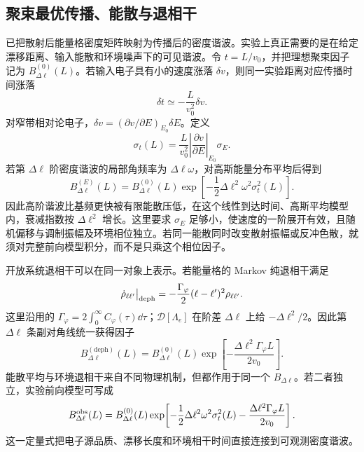 
\subsection{聚束最优传播、能散与退相干}\label{subsec:bunching-decoherence-closure-dp47}

 已把散射后能量格密度矩阵映射为传播后的密度谐波。实验上真正需要的是在给定漂移距离、输入能散和环境噪声下的可见谐波。令 $t=L/v_0$，并把理想聚束因子记为 $B_{\Delta\ell}^{(0)}(L)$。若输入电子具有小的速度涨落 $\delta v$，则同一实验距离对应传播时间涨落
\begin{equation*}
 \delta t\simeq-\frac{L}{v_0^2}\delta v.
\end{equation*}
对窄带相对论电子，$\delta v=(\partial v/\partial E)_{E_0}\delta E$。定义
\begin{equation}
{
 \sigma_t(L)
 =\frac{L}{v_0^2}
 \left|\frac{\partial v}{\partial E}\right|_{E_0}\sigma_E .}
\label{eq:arrival_time_jitter_energy_spread_dp47}
\end{equation}
若第 $\Delta\ell$ 阶密度谐波的局部角频率为 $\Delta\ell\omega$，对高斯能量分布平均后得到
\begin{equation}
{
 B_{\Delta\ell}^{(E)}(L)
 =B_{\Delta\ell}^{(0)}(L)
 \exp\!\left[-\frac12\Delta\ell^2\omega^2\sigma_t^2(L)\right].}
\label{eq:bunching_energy_spread_damping_dp47}
\end{equation}
因此高阶谐波比基频更快被有限能散压低，在这个线性到达时间、高斯平均模型内，衰减指数按 $\Delta\ell^2$ 增长。这里要求 $\sigma_E$ 足够小，使速度的一阶展开有效，且随机偏移与调制振幅及环境相位独立。若同一能散同时改变散射振幅或反冲色散，就须对完整前向模型积分，而不是只乘这个相位因子。

开放系统退相干可以在同一对象上表示。若能量格的 Markov 纯退相干满足
\begin{equation}
{
 \dot\rho_{\ell\ell'}\big|_{\rm deph}
 =-\frac{\Gamma_\varphi}{2}(\ell-\ell')^2\rho_{\ell\ell'}.}
\label{eq:bunching_pure_dephasing_master_dp68}
\end{equation}
这里沿用的 $\Gamma_\varphi=2\int_0^\infty C_\varphi(\tau)\dd\tau$；$\mathcal D[\Lambda_e]$ 在阶差 $\Delta\ell$ 上给 $-\Delta\ell^2/2$。因此第 $\Delta\ell$ 条副对角线统一获得因子
\begin{equation}
{
 B_{\Delta\ell}^{(\mathrm{deph})}(L)
 =B_{\Delta\ell}^{(0)}(L)
 \exp\!\left[-\frac{\Delta\ell^2\Gamma_\varphi L}{2v_0}\right].}
\label{eq:bunching_dephasing_damping_dp47}
\end{equation}
能散平均与环境退相干来自不同物理机制，但都作用于同一个 $B_{\Delta\ell}$。若二者独立，实验前向模型可写成
\begin{equation}
{
 B_{\Delta\ell}^{\rm obs}(L)
 =B_{\Delta\ell}^{(0)}(L)
 \exp\!\left[-\frac12\Delta\ell^2\omega^2\sigma_t^2(L)
 -\frac{\Delta\ell^2\Gamma_\varphi L}{2v_0}\right].}
\label{eq:bunching_observed_master_dp47}
\end{equation}
这一定量式把电子源品质、漂移长度和环境相干时间直接连接到可观测密度谐波。

